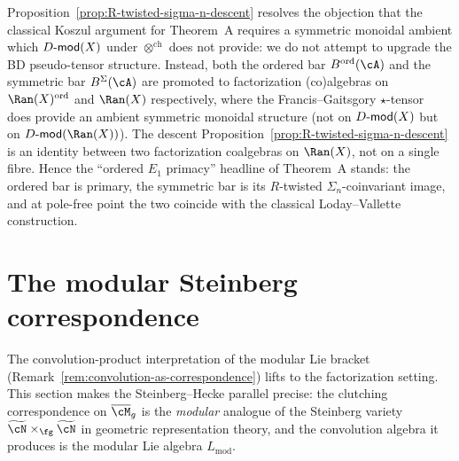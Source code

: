 \begin{remark}\label{rem:ordered-symmetric-bar-primacy}
Proposition~\ref{prop:R-twisted-sigma-n-descent} resolves the
objection that the classical Koszul argument for Theorem~A
requires a symmetric monoidal ambient which $D\text{-}\mathsf{mod}(X)$ under
$\otimes^{\mathrm{ch}}$ does not provide: we do not attempt to
upgrade the BD pseudo-tensor structure. Instead, both the ordered
bar $B^{\mathrm{ord}}(\cA)$ and the symmetric bar
$B^{\Sigma}(\cA)$ are promoted to factorization (co)algebras on
$\Ran(X)^{\mathrm{ord}}$ and $\Ran(X)$ respectively, where the
Francis--Gaitsgory $\star$-tensor~\cite[IV.5.2]{GR17} does provide
an ambient symmetric monoidal structure (not on $D\text{-}\mathsf{mod}(X)$ but on
$\Dmod(\Ran(X))$). The descent
Proposition~\ref{prop:R-twisted-sigma-n-descent} is an identity
between two factorization coalgebras on $\Ran(X)$, not on a single
fibre. Hence the ``ordered $E_1$ primacy'' headline of Theorem~A
stands: the ordered bar is primary, the symmetric bar is its
$R$-twisted $\Sigma_n$-coinvariant image, and at pole-free point
the two coincide with the classical Loday--Vallette
construction.
\end{remark}


\section{The modular Steinberg correspondence}
\label{sec:steinberg-hecke}

The convolution-product interpretation of the modular Lie bracket
(Remark~\ref{rem:convolution-as-correspondence}) lifts to
the factorization setting. This section makes the Steinberg--Hecke
parallel precise: the clutching correspondence on $\Mbar_g$ is the
\emph{modular} analogue of the Steinberg variety
$\widetilde{\cN}\times_\fg \widetilde{\cN}$ in geometric
representation theory, and the convolution algebra it produces is
the modular Lie algebra $L_{\mathrm{mod}}$.

